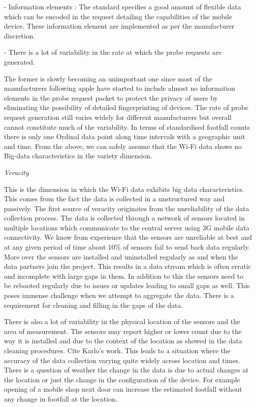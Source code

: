  - Information elements : The standard specifies a good amount of flexible data  which can be encoded in the request detailing the capabilities of the mobile  device.
These information element are implemented as per the manufacturer  discretion.

 - There is a lot of variability in the rate at which the probe requests are  generated.

The former is slowly becoming an unimportant one since most of the manufacturers following apple have started to include almost no information elements in the probe request packet to protect the privacy of users by eliminating the possibility of detailed fingerprinting of devices.
The rate of probe request generation still varies widely for different manufacturers but overall cannot constitute much of the variability.
In terms of standardised footfall counts there is only one Ordinal data point along time intervals with a geographic unit and time.
From the above, we can safely assume that the Wi-Fi data shows no Big-data characteristics in the variety dimension.


\vspace{1.5em}\noindent\textit{Veracity}\vspace{0.5em}

This is the dimension in which the Wi-Fi data exhibits big data characteristics.
This comes from the fact the data is collected in a unstructured way and passively.
The first source of veracity originates from the unreliability of the data collection process.
The data is collected through a network of sensors located in multiple locations which communicate to the central server using 3G mobile data connectivity.
We know from experience that the sensors are unreliable at best and at any given period of time about 10\% of sensors fail to send back data regularly.
More over the sensors are installed and uninstalled regularly as and when the data partners join the project.
This results in a data stream which is often erratic and incomplete with large gaps in them.
In addition to this the sensors need to be rebooted regularly due to issues or updates leading to small gaps as well.
This poses immense challenge when we attempt to aggregate the data.
There is a requirement for cleaning and filling in the gaps of the data.

There is also a lot of variability in the physical location of the sensors and the area of measurement.
The sensors may report higher or lower count due to the way it is installed and due to the context of the location as showed in the data cleaning procedures.
Cite Karlo's work.
This leads to a situation where the accuracy of the data collection varying quite widely across location and times.
There is a question of weather the change in the data is due to actual changes at the location or just the change in the configuration of the device.
For example opening of a mobile shop next door can increase the estimated footfall without any change in footfall at the location.

